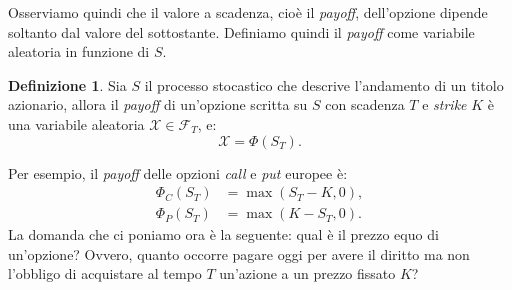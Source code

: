 \documentclass[a4paper,10pt]{report}
\theoremstyle{plain}
\theoremstyle{definition}
\newtheorem{definition}{Definizione}[chapter]
\theoremstyle{remark}
\begin{document}
Osserviamo quindi che il valore a scadenza, cio\`e il \emph{payoff}, dell'opzione dipende soltanto dal valore del sottostante. Definiamo quindi il
\emph{payoff} come variabile aleatoria in funzione di $S$.
\begin{definition}
Sia $S$ il processo stocastico che descrive l'andamento di un titolo azionario, allora il \emph{payoff} di un'opzione scritta su $S$ con scadenza $T$ e \emph{strike} $K$ \`e una variabile aleatoria $\mathcal{X}\in\mathcal{F}_T$, e: $$\mathcal{X}=\Phi(S_T).$$
\end{definition}
Per esempio, il \emph{payoff} delle opzioni \emph{call} e \emph{put} europee \`e:
\begin{align*}
\Phi_C(S_T)&=\max(S_T-K,0),\\
\Phi_P(S_T)&=\max(K-S_T,0).
\end{align*}
La domanda che ci poniamo ora \`e la seguente: qual \`e il prezzo equo di un'opzione? Ovvero, quanto occorre pagare oggi per avere il diritto ma non l'obbligo di acquistare al tempo $T$ un'azione a un prezzo fissato $K$?
\end{document}
